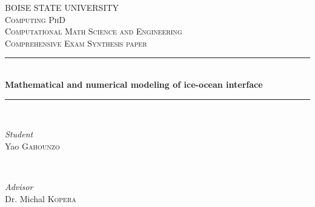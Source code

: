 \documentclass[11pt,a4paper]{article}
\date{October 4, 2021}
\begin{document}
	
	
	\begin{titlepage} %
	\newcommand{\HRule}{\rule{\linewidth}{0.5mm}} %
	
	\begin{center}
	
	\textsc{\LARGE BOISE STATE UNIVERSITY}\\[1.5cm] %
	
	\textsc{\Large Computing PhD}\\[0.5cm] %
	
	\textsc{\large Computational Math Science and Engineering}\\[0.5cm] %
	
	\textsc{\large Comprehensive Exam Synthesis paper}\\[2cm]
	
	
	\HRule\\[0.4cm]
	
	{\huge\bfseries Mathematical and numerical modeling of ice-ocean interface}\\[0.4cm] %
	
	\HRule\\[1.5cm]
	
	
	\begin{minipage}{0.4\textwidth}
		\begin{flushleft}
			\large
			\textit{Student}\\
			Yao \textsc{Gahounzo} %
		\end{flushleft}
	\end{minipage}
	~
	\begin{minipage}{0.4\textwidth}
		\begin{flushright}
			\large
			\textit{Advisor}\\
			Dr. Michal \textsc{Kopera} %
		\end{flushright}
	\end{minipage}
	

\end{center}
\end{titlepage}
\end{document}
